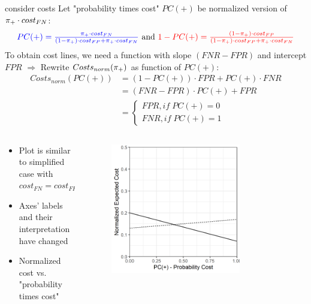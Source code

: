 \documentclass[11pt,compress,t,notes=noshow, xcolor=table]{beamer}
\begin{document}
\begin{vbframe}{consider costs}
Let "probability times cost" $PC(+)$ be normalized version of $\pi_{+}\cdot cost_{FN}$:
\begin{align*}
   {\color{blue}PC(+)=\tfrac{\pi_{+}\cdot cost_{FN}}{(1-\pi_{+})\cdot cost_{FP} + \pi_{+}\cdot cost_{FN}}} \text{ and }
   {\color{red}1-PC(+)=\tfrac{(1-\pi_{+})\cdot cost_{FP}}{(1-\pi_{+})\cdot cost_{FP} + \pi_{+}\cdot cost_{FN}}}
\end{align*}
To obtain cost lines, we need a function with slope $(FNR - FPR)$ and intercept $FPR$ $\Rightarrow$ Rewrite $Costs_{norm}(\pi_{+})$ as function of $PC(+)$:
\begin{align*}
Costs_{norm}(PC(+)) &= (1-PC(+))\cdot FPR + PC(+)\cdot FNR \\
&= (FNR - FPR)\cdot PC(+) + FPR \\
&= \begin{cases}
  FPR, if\; PC(+) = 0 \\
  FNR, if\; PC(+) = 1
\end{cases}
\end{align*}
\begin{columns}[c]
\begin{column}{0.49\textwidth}
\begin{itemize}
  \item Plot is similar to simplified case with $cost_{FN} = cost_{FP}$ %
  \item Axes' labels and their interpretation have changed
  \item Normalized cost vs. "probability times cost"
\end{itemize}
\end{column}
\begin{column}{0.49\textwidth}
\begin{figure}
  \centering\includegraphics[width=0.75\textwidth]{figure/cost_curve.png}
\end{figure}
\end{column}
\end{columns}
\end{vbframe}
\end{document}
